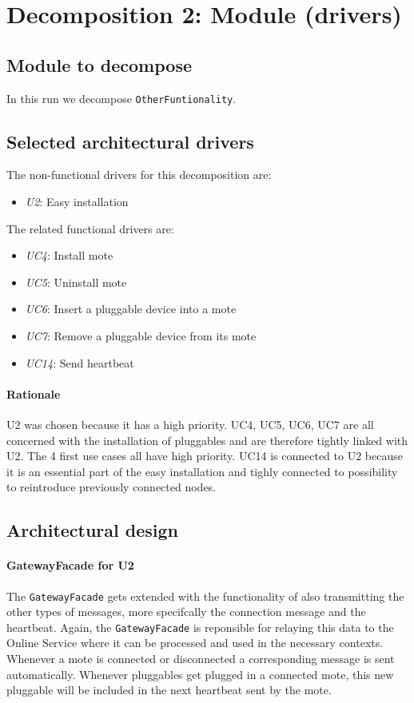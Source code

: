 \documentclass[english]{sareport}
\begin{document}
\section{Decomposition 2: Module (drivers)}
\subsection{Module to decompose}
In this run we decompose \texttt{OtherFuntionality}.
\subsection{Selected architectural drivers}
The non-functional drivers for this decomposition are:

\begin{itemize}
	\item \emph{U2}: Easy installation
\end{itemize}

The related functional drivers are:

\begin{itemize}
	\item \emph{UC4}: Install mote
	\item \emph{UC5}: Uninstall mote
	\item \emph{UC6}: Insert a pluggable device into a mote
	\item \emph{UC7}: Remove a pluggable device from its mote
	\item \emph{UC14}: Send heartbeat
\end{itemize}

\paragraph{Rationale}
U2 was chosen because it has a high priority. UC4, UC5, UC6, UC7 are all concerned with the installation of pluggables and are therefore tightly linked with U2. The 4 first use cases all have high priority. UC14 is connected to U2 because it is an essential part of the easy installation and tighly connected to possibility to reintroduce previously connected nodes.
\subsection{Architectural design}
\paragraph{GatewayFacade for U2}
The \texttt{GatewayFacade} gets extended with the functionality of also transmitting the other types of messages, more specifcally the connection message and the heartbeat. Again, the \texttt{GatewayFacade} is reponsible for relaying this data to the Online Service where it can be processed and used in the necessary contexts. Whenever a mote is connected or disconnected a corresponding message is sent automatically. Whenever pluggables get plugged in a connected mote, this new pluggable will be included in the next heartbeat sent by the mote.
\end{document}
